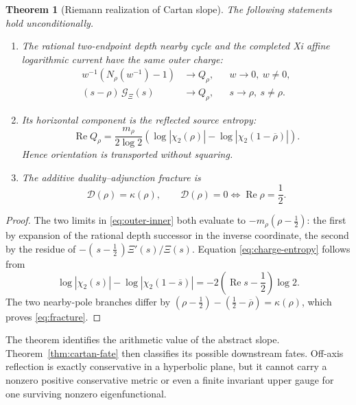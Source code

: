 \documentclass[11pt]{article}
\newtheorem{theorem}{Theorem}[section]
\theoremstyle{definition}
\theoremstyle{remark}
\newcommand{\cD}{\mathcal D}
\newcommand{\cG}{\mathcal G}
\newcommand{\Rea}{\operatorname{Re}}
\begin{document}
\begin{theorem}[Riemann realization of Cartan slope]
\label{thm:main}
The following statements hold unconditionally.

\begin{enumerate}[label=\textup{(\roman*)},leftmargin=2em]
\item The rational two-endpoint depth nearby cycle and the completed Xi
      affine logarithmic current have the same outer charge:
      \[
      \begin{aligned}
       w^{-1}\!\left(N_\rho(w^{-1})-1\right)&\longrightarrow Q_\rho,
                 &&w\to0,\ w\ne0,\\
       (s-\rho)\,\cG_\Xi(s)&\longrightarrow Q_\rho,
                 &&s\to\rho,\ s\ne\rho.
      \end{aligned}
      \tag{4.4}\label{eq:outer-inner}
      \]
\item Its horizontal component is the reflected source entropy:
      \[
       \Rea Q_\rho
       =\frac{m_\rho}{2\log2}
          \left(\log|\chi_2(\rho)|
          -\log|\chi_2(1-\overline{\rho})|\right).
      \tag{4.5}\label{eq:charge-entropy}
      \]
      Hence orientation is transported without squaring.
\item The additive duality--adjunction fracture is
      \[
                    \cD(\rho)=\kappa(\rho),
      \qquad
                    \cD(\rho)=0
                    \Longleftrightarrow
                    \Rea\rho=\frac12.
      \tag{4.6}\label{eq:fracture}
      \]
\end{enumerate}
\end{theorem}

\begin{proof}
The two limits in \eqref{eq:outer-inner} both evaluate to
\(-m_\rho(\rho-\tfrac12)\): the first by expansion of the rational depth
successor in the inverse coordinate, the second by the residue of
\(-(\,s-\tfrac12\,)\Xi'(s)/\Xi(s)\).
Equation \eqref{eq:charge-entropy} follows from
\[
 \log|\chi_2(s)|-\log|\chi_2(1-\overline{s})|
 =-2\left(\Rea s-\frac12\right)\log2.
\]
The two nearby-pole branches differ by
\((\rho-\tfrac12)-(\tfrac12-\overline{\rho})=\kappa(\rho)\),
which proves \eqref{eq:fracture}.
\end{proof}

The theorem identifies the arithmetic value of the abstract slope.
Theorem~\ref{thm:cartan-fate} then classifies its possible downstream
fates.  Off-axis reflection is exactly conservative in a hyperbolic plane,
but it cannot carry a nonzero positive conservative metric or even a finite
invariant upper gauge for one surviving nonzero eigenfunctional.
\end{document}
